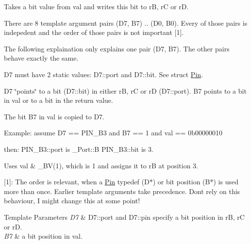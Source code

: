 Takes a bit value from {\ttfamily val} and writes this bit to {\ttfamily rB}, {\ttfamily rC} or {\ttfamily rD}. 

There are 8 template argument pairs (D7, B7) .. (D0, B0). Every of those pairs is indepedent and the order of those pairs is not important \mbox{[}1\mbox{]}.

The following explaination only explains one pair (D7, B7). The other pairs behave exactly the same.

{\ttfamily D7} must have 2 static values\+: {\ttfamily D7\+::port} and {\ttfamily D7\+::bit}. See struct \hyperlink{structports_1_1Pin}{Pin}.

{\ttfamily D7} \char`\"{}points\char`\"{} to a bit ({\ttfamily D7\+::bit}) in either {\ttfamily rB}, {\ttfamily rC} or {\ttfamily rD} ({\ttfamily D7\+::port}). {\ttfamily B7} points to a bit in {\ttfamily val} or to a bit in the return value.

The bit {\ttfamily B7} in {\ttfamily val} is copied to {\ttfamily D7}.

Example\+: assume {\ttfamily D7 == P\+I\+N\+\_\+\+B3} and {\ttfamily B7 == 1} and {\ttfamily val == 0b00000010}

then\+: {\ttfamily P\+I\+N\+\_\+\+B3\+::port} is {\ttfamily \+\_\+\+Port\+::B} {\ttfamily P\+I\+N\+\_\+\+B3\+::bit} is 3.

Uses {\ttfamily val \& \+\_\+\+B\+V(1)}, which is 1 and assigns it to {\ttfamily rB} at position 3.

\mbox{[}1\mbox{]}\+: The order is relevant, when a \hyperlink{structports_1_1Pin}{Pin} {\ttfamily typedef} (D$\ast$) or bit position (B$\ast$) is used more than once. Earlier template arguments take precedence. Don\textquotesingle{}t rely on this behaviour, I might change this at some point!


\begin{DoxyTemplParams}{Template Parameters}
{\em D7} & {\ttfamily D7\+::port} and {\ttfamily D7\+::pin} specify a bit position in {\ttfamily rB}, {\ttfamily rC} or {\ttfamily rD}. \\
\hline
{\em B7} & a bit position in {\ttfamily val}. \\
\hline
\end{DoxyTemplParams}
\hypertarget{namespaceports_ac9262ca010e65ff684986eef2900942f}{}\label{namespaceports_ac9262ca010e65ff684986eef2900942f} 
